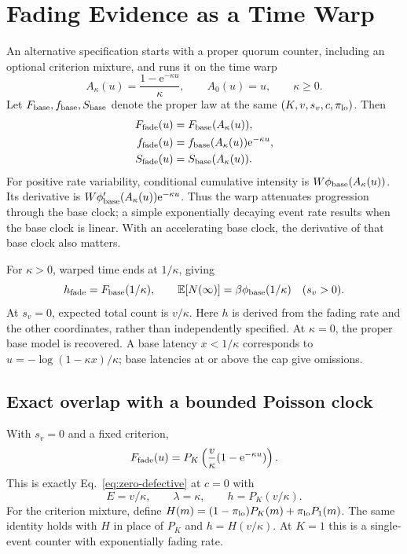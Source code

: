 \documentclass[12pt]{article}
\newcommand{\e}{\mathrm{e}}
\newcommand{\E}{\mathbb{E}}
\theoremstyle{definition}
\theoremstyle{plain}
\theoremstyle{remark}
\begin{document}
\section{Fading Evidence as a Time Warp}\label{sec:fade}

An alternative specification starts with a proper quorum counter, including an optional criterion mixture, and runs it on the time warp
\begin{equation}
 A_\kappa(u)=\frac{1-\e^{-\kappa u}}{\kappa},\qquad
 A_0(u)=u,\qquad \kappa\geq0.\label{eq:fading-clock}
\end{equation}
Let $F_{\rm base},f_{\rm base},S_{\rm base}$ denote the proper law at the same $(K,v,s_v,c,\pi_{\rm lo})$. Then
\begin{align}
 F_{\rm fade}(u)&=F_{\rm base}(A_\kappa(u)),\\
 f_{\rm fade}(u)&=f_{\rm base}(A_\kappa(u))\e^{-\kappa u},\\
 S_{\rm fade}(u)&=S_{\rm base}(A_\kappa(u)).\label{eq:fading-law}
\end{align}
For positive rate variability, conditional cumulative intensity is $W\phi_{\rm base}(A_\kappa(u))$. Its derivative is $W\phi_{\rm base}'(A_\kappa(u))\e^{-\kappa u}$. Thus the warp attenuates progression through the base clock; a simple exponentially decaying event rate results when the base clock is linear. With an accelerating base clock, the derivative of that base clock also matters.

For $\kappa>0$, warped time ends at $1/\kappa$, giving
\begin{equation}
 h_{\rm fade}=F_{\rm base}(1/\kappa),\qquad
 \E[N(\infty)]=\beta\phi_{\rm base}(1/\kappa)\quad(s_v>0).\label{eq:fading-h}
\end{equation}
At $s_v=0$, expected total count is $v/\kappa$. Here $h$ is derived from the fading rate and the other coordinates, rather than independently specified. At $\kappa=0$, the proper base model is recovered. A base latency $x<1/\kappa$ corresponds to $u=-\log(1-\kappa x)/\kappa$; base latencies at or above the cap give omissions.

\subsection{Exact overlap with a bounded Poisson clock}
With $s_v=0$ and a fixed criterion,
\begin{equation}
 F_{\rm fade}(u)=P_K\left(\frac v\kappa(1-\e^{-\kappa u})\right).\label{eq:poisson-fade}
\end{equation}
This is exactly Eq.~\eqref{eq:zero-defective} at $c=0$ with
\begin{equation}
 E=v/\kappa,\qquad \lambda=\kappa,\qquad h=P_K(v/\kappa).
\end{equation}
For the criterion mixture, define $H(m)=(1-\pi_{\rm lo})P_K(m)+\pi_{\rm lo}P_1(m)$. The same identity holds with $H$ in place of $P_K$ and $h=H(v/\kappa)$. At $K=1$ this is a single-event counter with exponentially fading rate.
\end{document}
